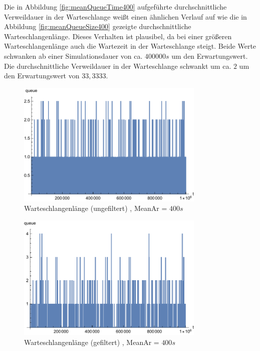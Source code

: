 Die in Abbildung \ref{fig:meanQueueTime400} aufgeführte durchschnittliche Verweildauer in der Warteschlange weißt einen ähnlichen Verlauf auf wie die in Abbildung \ref{fig:meanQueueSize400} gezeigte durchschnittliche Warteschlangenlänge. Dieses Verhalten ist plausibel, da bei einer größeren Warteschlangenlänge auch die Wartezeit in der Warteschlange steigt. Beide Werte schwanken ab einer Simulationsdauer von ca. $400000s$ um den Erwartungswert. Die durchschnittliche Verweildauer in der Warteschlange schwankt um ca. $2$ um den Erwartungswert von $33,3333$.

\begin{figure}[htpb]
	\centering
	\includegraphics[width=0.8\textwidth]{abbildungen/1_Phone/Arrival_400_Serve_100_dur_1000000_Skip_0/QueueStepPlotAll.pdf}
	\caption{Warteschlangenlänge (ungefiltert) , MeanAr = $400s$}
	\label{fig:QueueStepPlotAll400}
\end{figure}
\begin{figure}[htpb]
	\centering
	\includegraphics[width=0.8\textwidth]{abbildungen/1_Phone/Arrival_400_Serve_100_dur_1000000_Skip_0/QueueStepPlotAllFiltered.pdf}
	\caption{Warteschlangenlänge (gefiltert) , MeanAr = $400s$}
	\label{fig:QueueStepPlotAllFiltered400}
\end{figure}

